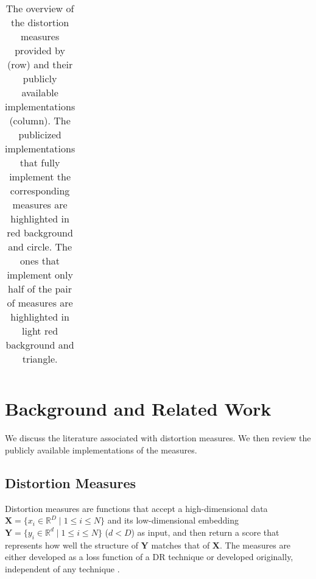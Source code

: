 \begin{table*}[h]
{\begin{tabular}{%
	rrcc|c *{14}{c}%
	}
  \bottomrule
  \end{tabular}%
}
\vspace{2mm}
    \caption{The overview of the distortion measures provided by \library (row) and their publicly available implementations (column). The publicized implementations that fully implement the corresponding measures are highlighted in red background and circle. The ones that implement only half of the pair of measures are highlighted in light red background and triangle. \vspace{-4mm}}
  \label{tab:measures}
\end{table*}




\section{Background and Related Work}

\label{sec:relwork}

We discuss the literature associated with distortion measures. We then review the publicly available implementations of the measures.

\subsection{Distortion Measures}

\label{sec:relmeasure}

Distortion measures are functions that accept a high-dimensional data $\mathbf{X} = \{x_i \in \mathbb{R}^D \mid 1 \leq i \leq N \}$ and its low-dimensional embedding $\mathbf{Y} = \{y_i \in \mathbb{R}^d \mid 1 \leq i \leq N \}$ ($d < D$) as input, and then return a score that represents how well the structure of $\mathbf{Y}$ matches that of $\mathbf{X}$. The measures are either developed as a loss function of a DR technique \cite{hinton02nips, colange20neurips} or developed originally, independent of any technique \cite{jeon21tvcg, lee07springer}. 

